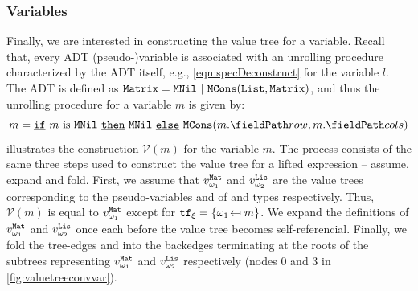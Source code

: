 \subsubsection{Variables}
\vspace{-4px}
Finally, we are interested in constructing the value tree for a variable.
Recall that, every ADT (pseudo-)variable is associated with an unrolling procedure
characterized by the ADT itself, e.g., \cref{eqn:specDeconstruct}
for the  variable $l$.
The  ADT is defined as
{\small $\type{Matrix} = \cons{MNil} \ | \ \cons{MCons}(\type{List},\type{Matrix})$},
and thus the unrolling procedure for a  variable $m$ is given by:
\vspace{-4px}
\begin{equation}
\label{eqn:matrixunrollingprocedure}
m = \sumIf{\sumIs{m}{MNil}} \  \sumThen{\cons{MNil}} \  \sumElse{\cons{MCons}(\prodAccess{m}{row}, \prodAccess{m}{cols})}
\end{equation}
\vspace{-4px}
 illustrates the construction $\mathcal{V}(m)$ for the  variable $m$.
The process consists of the same three steps used to construct the value tree
for a lifted expression -- assume, expand and fold.
First, we assume that $v_{\omega_{1}\!}^{\tt Mat}$ and $v_{\omega_{2}\!}^{\tt Lis}$ are the value trees
corresponding to the pseudo-variables  and  of  and 
types respectively.
Thus, $\mathcal{V}(m)$ is equal to $v_{\omega_{1}\!}^{\tt Mat}$ except for ${\tt tf}{}_\xi = \{ {\omega_{1}\!} \mapsfrom m \}$.
We expand the definitions of $v_{\omega_{1}\!}^{\tt Mat}$ and $v_{\omega_{2}\!}^{\tt Lis}$ once each before
the value tree becomes self-referencial.
Finally, we fold the tree-edges  and  into the backedges
terminating at the roots of the subtrees representing $v_{\omega_{1}\!}^{\tt Mat}$ and $v_{\omega_{2}\!}^{\tt Lis}$
respectively (nodes 0 and 3 in \cref{fig:valuetreeconvvar}).

